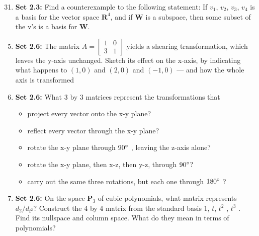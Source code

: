 \documentclass[a4paper,10pt]{article}
\begin{document}
\begin{enumerate}
\setcounter{enumi}{30}
\item \textbf{Set 2.3:} Find a counterexample to the following statement: If $v_1$, $v_2$, $v_3$, $v_4$ is a basis for the
vector space $\textbf{R}^4$, and if $\textbf{W}$ is a subspace, then some subset of the v’s is a basis for $\textbf{W}$.
\end{enumerate}

\begin{enumerate}
 \setcounter{enumi}{4}
 \item \textbf{Set 2.6:} The matrix $A = \begin{bmatrix}
                                          1 & 0\\3 & 1
                                         \end{bmatrix}
$ yields a shearing transformation, which leaves the y-axis unchanged. Sketch its effect on the x-axis, by indicating what happens to $(1, 0)$ and $(2, 0)$ and $(−1, 0)$ — and how the whole axis is transformed
\end{enumerate}

\begin{enumerate}
 \setcounter{enumi}{5}
 \item \textbf{Set 2.6:} What 3 by 3 matrices represent the transformations that
 \begin{itemize}
  \item project every vector onto the x-y plane?
  \item reflect every vector through the x-y plane?
  \item rotate the x-y plane through $90\degree$ , leaving the z-axis alone?
  \item rotate the x-y plane, then x-z, then y-z, through $90\degree$?
  \item carry out the same three rotations, but each one through $180\degree$ ?
 \end{itemize}
\end{enumerate}

\begin{enumerate}
 \setcounter{enumi}{6}
 \item \textbf{Set 2.6:} On the space $\textbf{P}_3$ of cubic polynomials, what matrix represents $d_2/d_{t^2}$? Construct
the 4 by 4 matrix from the standard basis $1$, $t$, $t^2$ , $t^3$ . Find its nullspace and column
space. What do they mean in terms of polynomials?
\end{enumerate}
\end{document}
